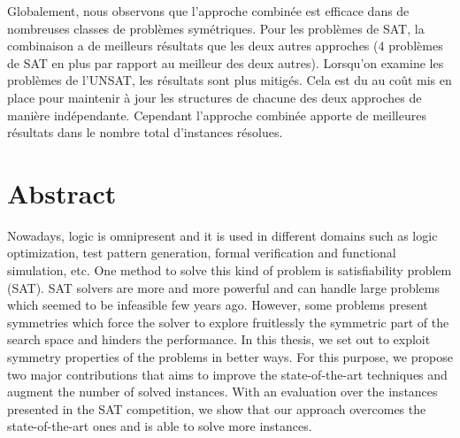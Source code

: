 Globalement, nous observons que l'approche combinée est efficace dans de nombreuses classes de problèmes symétriques. Pour les problèmes de SAT, la combinaison a de meilleurs résultats que les deux autres approches (4 problèmes de SAT en plus par rapport au meilleur des deux autres). Lorsqu'on examine les problèmes de l'UNSAT, les résultats sont plus mitigés. Cela est du au coût mis en place pour maintenir à jour les structures de chacune des deux approches de manière indépendante.
Cependant l'approche combinée apporte de meilleures résultats dans le nombre total d'instances résolues.


\chapter*{Abstract}
Nowadays, logic is omnipresent and it is used in different domains such as logic optimization, test pattern generation, formal verification and functional simulation, etc.
One method to solve this kind of problem is satisfiability problem (SAT).
SAT solvers are more and more powerful and can handle large problems which seemed to be infeasible 
few years ago. However, some problems present symmetries which force the solver to explore fruitlessly
the symmetric part of the search space and hinders the performance. 
In this thesis, we set out to exploit symmetry properties of the problems in better ways.
For this purpose, we propose two major contributions that aims to improve the state-of-the-art techniques and augment the number of solved instances. With an evaluation over the instances presented in the SAT competition, we show that our approach overcomes the state-of-the-art ones and is able to solve more instances. 